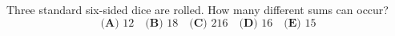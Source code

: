 Three standard six-sided dice are rolled. How many different sums can occur?
\[\textbf{(A) }12\quad\textbf{(B) }18\quad\textbf{(C) }216\quad\textbf{(D) }16\quad\textbf{(E) }15\]
